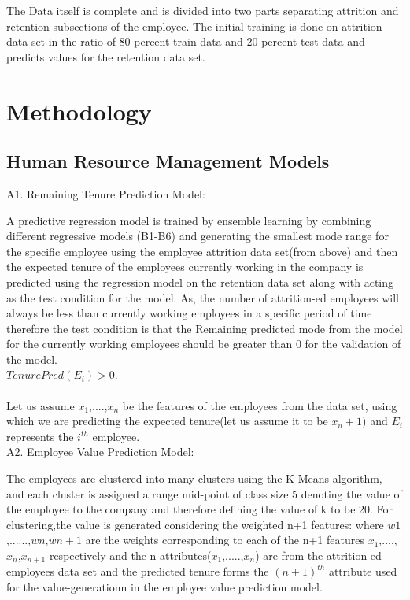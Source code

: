 \documentclass[a4paper, 14 pt, conference]{ieeeconf}
\begin{document}
The Data itself is complete and is divided into two parts separating attrition and retention subsections of the employee.
The initial training is done on attrition data set in the ratio of 80 percent train data and 20 percent test data and predicts values for the retention data set.

\section{Methodology}
\subsection{Human Resource Management Models}
A1.  Remaining Tenure Prediction Model:

A predictive regression model is trained by ensemble learning by combining different regressive models (B1-B6) and generating the smallest mode range for the specific employee using the employee attrition data set(from above) and then the expected tenure of the employees currently working in the company is predicted using the regression model on the retention data set along with acting as the test condition for the model. As, the number of attrition-ed employees will always be less than currently working employees in a specific period of time therefore the test condition is that the Remaining predicted mode from the model for the currently working employees should be greater than 0 for the validation of the model.
\\
$TenurePred(E_{i})>0$.
\\
\\
Let us assume $x_{1}$,....,$x_{n}$ be the features of the employees from the data set, using which we are predicting the expected tenure(let us assume it to be $x_n+1$) and $E_{i}$ represents the $i^{th}$ employee.
\\

A2.  Employee Value Prediction Model:

The employees are clustered into many clusters using the K Means algorithm, and each cluster is assigned a range mid-point of class size 5 denoting the value of the employee to the company and therefore defining the value of k to be 20.
For clustering,the value is generated considering the weighted n+1 features:
where $w{1}$,......,$w{n}$,$w{n+1}$ are the weights corresponding to each of the n+1 features $x_{1}$,....,$x_{n}$,$x_{n+1}$ respectively and the n attributes($x_{1}$,.....,$x_{n}$) are from the attrition-ed employees data set and the predicted tenure forms the $(n+1)^{th}$ attribute used for the value-generationn in the employee value prediction  model.
\\
\end{document}
